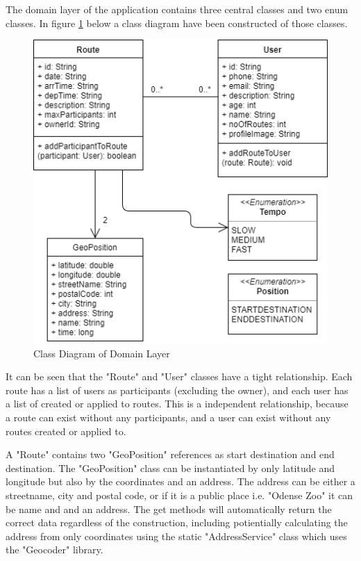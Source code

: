 The domain layer of the application contains three central classes and two enum classes. In figure \ref{fig:domain_layer} below a class diagram have been constructed of those classes. 

\begin{figure}[H]
    \centering
    \includegraphics[scale=0.5]{Graphics/Images/domain_class_diagram.png}
    \caption{Class Diagram of Domain Layer}
    \label{fig:domain_layer}
\end{figure}

It can be seen that the "Route" and "User" classes have a tight relationship. Each route has a list of users as participants (excluding the owner), and each user has a list of created or applied to routes. This is a independent relationship, because a route can exist without any participants, and a user can exist without any routes created or applied to.

A "Route" contains two "GeoPosition" references as start destination and end destination.
The "GeoPosition" class can be instantiated by only latitude and longitude but also by the coordinates and an address. The address can be either a streetname, city and postal code, or if it is a public place i.e. "Odense Zoo" it can be name and and an address. The get methods will automatically return the correct data regardless of the construction, including potientially calculating the address from only coordinates using the static "AddressService" class which uses the "Geocoder" library.

